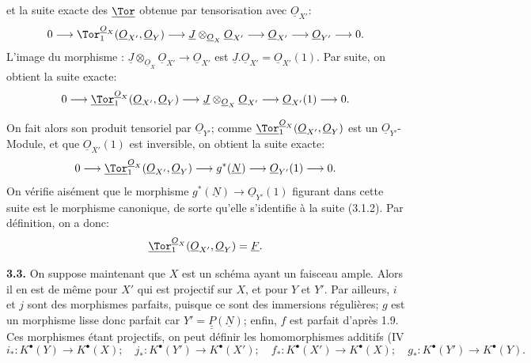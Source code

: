 
et la
suite exacte des \(\underline{\Tor}\) obtenue par tensorisation avec \(\underline{O}_{X'}\):
\[
0\longrightarrow
\Tor_1^{\underline{O}_X}(\underline{O}_{X'},\underline{O}_Y)
\longrightarrow
\underline{J}\otimes_{\underline{O}_X}\underline{O}_{X'}
\longrightarrow
\underline{O}_{X'}
\longrightarrow
\underline{O}_{Y'}
\longrightarrow0.
\]
L'image du morphisme : \(\underline{J}\otimes_{\underline{O}_X}\underline{O}_{X'}\to\underline{O}_{X'}\) est
\(\underline{J}.\underline{O}_{X'}=\underline{O}_{X'}(1)\). Par suite, on obtient la suite exacte:
\[
0\longrightarrow
\underline{\Tor}_1^{\underline{O}_X}(\underline{O}_{X'},\underline{O}_Y)
\longrightarrow
\underline{J}\otimes_{\underline{O}_X}\underline{O}_{X'}
\longrightarrow
\underline{O}_{X'}(1)
\longrightarrow0.
\]

On fait alors son produit tensoriel par \(\underline{O}_{Y'}\); comme
\(\underline{\Tor}_1^{\underline{O}_X}(\underline{O}_{X'},\underline{O}_Y)\) est un \(\underline{O}_{Y'}\)-Module, et que
\(\underline{O}_{X'}(1)\) est inversible, on obtient la suite exacte:
\[
0\longrightarrow
\underline{\Tor}_1^{\underline{O}_X}(\underline{O}_{X'},\underline{O}_Y)
\longrightarrow
g^*(\underline{N})
\longrightarrow
\underline{O}_{Y'}(1)
\longrightarrow0.
\]
On vérifie aisément que le morphisme \(g^*(\underline{N})\to\underline{O}_{Y'}(1)\) figurant dans cette suite est le morphisme canonique, de sorte qu'elle s'identifie à la suite (3.1.2). Par définition, on a donc:
\[
\underline{\Tor}_1^{\underline{O}_X}(\underline{O}_{X'},\underline{O}_Y)=\underline{F}.
\]

\textbf{3.3.} On suppose maintenant que \(X\) est un schéma ayant un faisceau ample. Alors il en est de même pour \(X'\) qui est projectif sur \(X\), et pour \(Y\) et \(Y'\). Par ailleurs, \(i\) et \(j\) sont des morphismes parfaits, puisque ce sont des immersions régulières; \(g\) est un morphisme lisse donc parfait car \(Y'=\underline{\underline{P}}(\underline{N})\); enfin, \(f\) est parfait d'après 1.9. Ces morphismes étant projectifs, on peut définir les homomorphismes additifs (IV
\[
i_*:K^{\bullet}(Y)\to K^{\bullet}(X);\quad
j_*:K^{\bullet}(Y')\to K^{\bullet}(X');\quad
f_*:K^{\bullet}(X')\to K^{\bullet}(X);\quad
g_*:K^{\bullet}(Y')\to K^{\bullet}(Y).
\]


